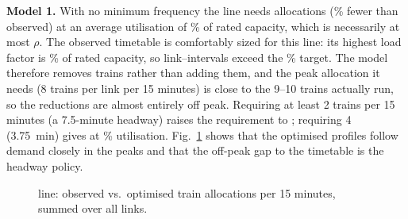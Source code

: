 \documentclass[conference]{IEEEtran}
\begin{document}
\textbf{Model 1.} With no minimum frequency the line needs \CaseMOneAlloc{} allocations (\CaseMOneRed\% fewer than
observed) at an average utilisation of \CaseMOneUtil\% of rated capacity, which is necessarily at most $\rho$. The
observed timetable is comfortably sized for this line: its highest load factor is \CaseMaxLF\% of rated capacity, so
\CaseMOneExistingShort{} link--intervals exceed the \Rho\% target. The model therefore removes trains rather than
adding them, and the peak allocation it needs (8 trains per link per 15 minutes) is close to the 9--10 trains actually
run, so the reductions are almost entirely off peak. Requiring at least 2 trains per 15 minutes (a 7.5-minute headway) raises the requirement to \CaseMOneMinTwo; requiring
4 (3.75~min) gives \CaseMOneMinFour{} at \CaseMOneMinFourUtil\% utilisation. Fig.~\ref{fig:case} shows that the
optimised profiles follow demand closely in the peaks and that the off-peak gap to the timetable is the headway
policy.

\begin{figure}[!t]\centering
{}
\caption{\CaseLine{} line: observed vs.\ optimised train allocations per 15 minutes, summed over all links.}\label{fig:case}
\end{figure}
\end{document}
